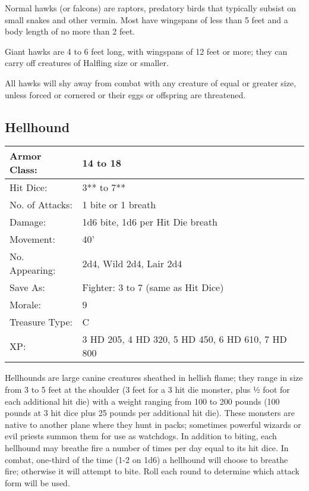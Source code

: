 \documentclass[a4paper,twoside,openany,10pt]{book}
\begin{document}
\begin{multicols}{2}
Normal hawks (or falcons) are raptors, predatory birds that typically subsist on small snakes and other vermin. Most have wingspans of less than 5 feet and a body length of no more than 2 feet.

Giant hawks are 4 to 6 feet long, with wingspans of 12 feet or more; they can carry off creatures of Halfling size or smaller.

All hawks will shy away from combat with any creature of equal or greater size, unless forced or cornered or their eggs or offspring are threatened.

\subsection*{Hellhound}\label{hellhound}

\begin{tabularx}{0.48\textwidth}{@{}lX@{}}
Armor Class: & 14 to 18 \\\hline
Hit Dice: & 3** to 7** \\\hline
No. of Attacks: & 1 bite or 1 breath \\\hline
Damage: & 1d6 bite, 1d6 per Hit Die breath \\\hline
Movement: & 40' \\\hline
No. Appearing: & 2d4, Wild 2d4, Lair 2d4 \\\hline
Save As: & Fighter: 3 to 7 (same as Hit Dice) \\\hline
Morale: & 9 \\\hline
Treasure Type: & C \\\hline
XP: & 3 HD 205, 4 HD 320, 5 HD 450, 6 HD 610, 7 HD 800 \\\hline
\end{tabularx}\medskip

Hellhounds are large canine creatures sheathed in hellish flame; they range in size from 3 to 5 feet at the shoulder (3 feet for a 3 hit die monster, plus ½ foot for each additional hit die) with a weight ranging from 100 to 200 pounds (100 pounds at 3 hit dice plus 25 pounds per additional hit die). These monsters are native to another plane where they hunt in packs; sometimes powerful wizards or evil priests summon them for use as watchdogs. In addition to biting, each hellhound may breathe fire a number of times per day equal to its hit dice. In combat, one-third of the time (1-2 on 1d6) a hellhound will choose to breathe fire; otherwise it will attempt to bite. Roll each round to determine which attack form will be used.


\end{multicols}
\end{document}

